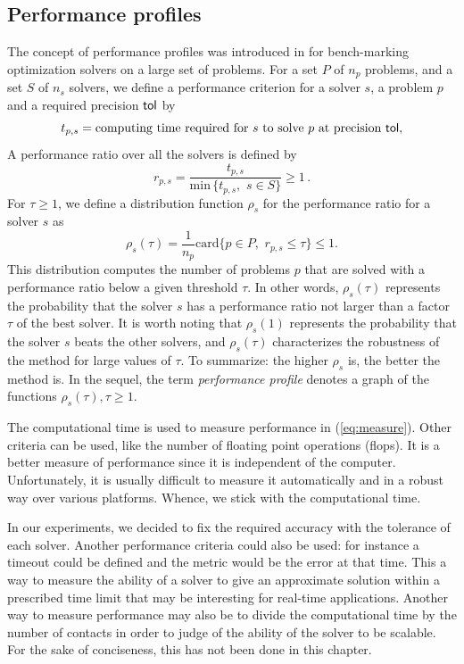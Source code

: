 \subsection{Performance profiles}

The concept of performance profiles was introduced in \citep{Dolan.More_MP2002} for bench-marking optimization solvers on a large set of problems. For a set $P$ of $n_p$ problems, and a set $S$ of $n_s$ solvers, we define a performance criterion for a solver $s$, a problem $p$ and a required precision $\sf tol$ by
\begin{equation}
  \label{eq:measure}
 t_{p,s} = \text{computing time required for}\, \,  s\, \,  \text{to solve}\, \,  p \, \,  \text{at precision } \sf tol, 
\end{equation}
A performance ratio over all the solvers is defined by
\begin{equation}
 r_{p, s} = \frac{t_{p,s}}{\text{min}\, \{t_{p,s}, \, \, s \in S\}} \geq 1 \, .
\end{equation}
For $\tau \geq 1$, we define a  distribution function $\rho_s$ for the performance ratio for a solver $s$ as
\begin{equation}
 \rho_s(\tau) = \frac{1}{n_p} \text{card} \{p \in P, \, \, r_{p, s} \leq \tau\} \leq 1.
\end{equation}
This distribution computes the number of problems $p$ that are solved with a performance ratio below a given threshold $\tau$. In other words, $\rho_s(\tau)$ represents the probability that the solver $s$ has a performance ratio not larger than a factor $\tau$ of the best solver. It is worth noting that $\rho_s(1)$ represents the probability that the solver $s$ beats the other solvers, and $\rho_s(\tau)$ characterizes the robustness of the method for large values of $\tau$.
To summarize: the higher $\rho_s$ is, the better the method is. In the sequel, the term \emph{performance profile} denotes a graph of the functions $\rho_s(\tau), \tau \geq 1$.

The computational time is used to measure performance in (\ref{eq:measure}). 
Other criteria can be used, like the number of floating point operations (flops).
It is a better measure of performance since it is independent of the computer. Unfortunately, it is usually difficult to measure it automatically and in a robust way over various platforms.
Whence, we stick with the computational time.

In our experiments, we decided to fix the required accuracy with the tolerance of each solver.
Another performance criteria could also  be used: for instance {a timeout could be defined and the metric would be the error at that time.}
This a way to measure the ability of a solver to give an approximate solution within a prescribed   time limit that may be interesting for real-time applications. Another way to measure performance may also be to divide the computational time by the number of contacts in order to judge of the ability of the solver to be scalable. For the sake of conciseness, this has not been done in this chapter.


